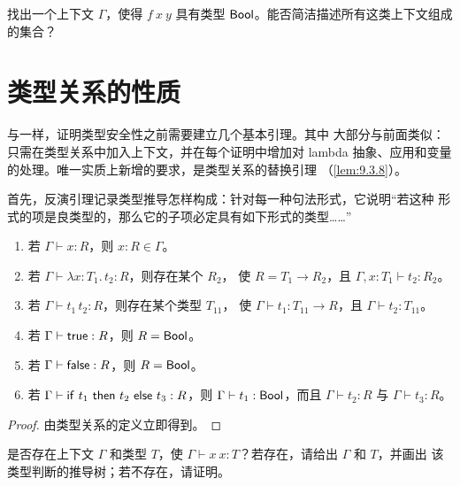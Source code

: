 \begin{exercise}[\(\star\)]
\label{ex:9.2.3}
找出一个上下文 \(\Gamma\)，使得 \(f\ x\ y\) 具有类型
\(\mathsf{Bool}\)。能否简洁描述所有这类上下文组成的集合？
\end{exercise}

\section{类型关系的性质}
\label{sec:9.3}

与一样，证明类型安全性之前需要建立几个基本引理。其中
大部分与前面类似：只需在类型关系中加入上下文，并在每个证明中增加对 lambda
抽象、应用和变量的处理。唯一实质上新增的要求，是类型关系的替换引理
（\cref{lem:9.3.8}）。

首先，反演引理记录类型推导怎样构成：针对每一种句法形式，它说明“若这种
形式的项是良类型的，那么它的子项必定具有如下形式的类型……”

\taplstatementliststart
\begin{lemma}[类型关系的反演]
\label{lem:9.3.1}
\taplstatementlistbreak
\begin{enumerate}
  \item 若 \(\Gamma\vdash x:R\)，则 \(x:R\in\Gamma\)。
  \item 若 \(\Gamma\vdash\lambda x:T_1.\,t_2:R\)，则存在某个 \(R_2\)，
    使 \(R=T_1\to R_2\)，且
    \(\Gamma,x:T_1\vdash t_2:R_2\)。
  \item 若 \(\Gamma\vdash t_1\,t_2:R\)，则存在某个类型 \(T_{11}\)，
    使 \(\Gamma\vdash t_1:T_{11}\to R\)，且
    \(\Gamma\vdash t_2:T_{11}\)。
  \item 若 \(\Gamma\vdash\mathsf{true}:R\)，则
    \(R=\mathsf{Bool}\)。
  \item 若 \(\Gamma\vdash\mathsf{false}:R\)，则
    \(R=\mathsf{Bool}\)。
  \item 若 \(\Gamma\vdash\mathsf{if}\ t_1\ \mathsf{then}\ t_2\ \mathsf{else}\ t_3:R\)，则
    \(\Gamma\vdash t_1:\mathsf{Bool}\)，而且
    \(\Gamma\vdash t_2:R\) 与 \(\Gamma\vdash t_3:R\)。
\end{enumerate}
\end{lemma}

\begin{proof}
由类型关系的定义立即得到。
\end{proof}

\begin{exercise}
\label{ex:9.3.2}
是否存在上下文 \(\Gamma\) 和类型 \(T\)，使
\(\Gamma\vdash x\ x:T\)？若存在，请给出 \(\Gamma\) 和 \(T\)，并画出
该类型判断的推导树；若不存在，请证明。
\end{exercise}

